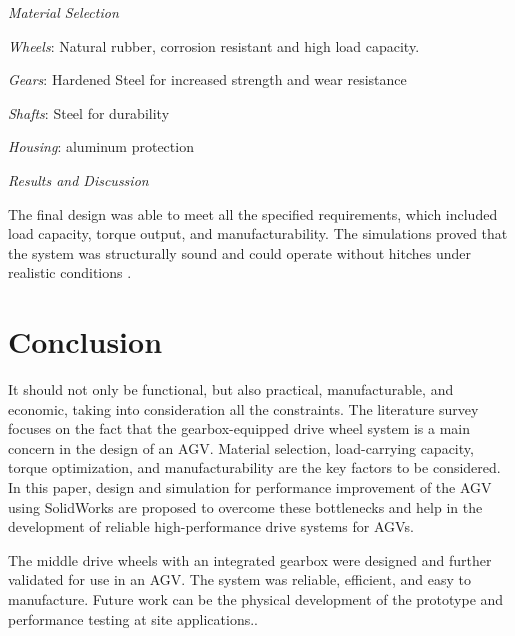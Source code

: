 \documentclass[../../main]{subfiles}
\begin{document}
\emph{Material Selection}

\emph{Wheels}: Natural rubber, corrosion resistant and high load capacity.

\emph{Gears}: Hardened Steel for increased strength and wear resistance

\emph{Shafts}: Steel for durability

\emph{Housing}: aluminum protection

\emph{Results and Discussion}

The final design was able to meet all the specified requirements, which
included load capacity, torque output, and manufacturability. The
simulations proved that the system was structurally sound and could
operate without hitches under realistic conditions .
\newpage
\section{Conclusion}

It should not only be functional, but also practical, manufacturable,
and economic, taking into consideration all the constraints. The
literature survey focuses on the fact that the gearbox-equipped drive
wheel system is a main concern in the design of an AGV. Material
selection, load-carrying capacity, torque optimization, and
manufacturability are the key factors to be considered. In this paper,
design and simulation for performance improvement of the AGV using
SolidWorks are proposed to overcome these bottlenecks and help in the
development of reliable high-performance drive systems for AGVs.

The middle drive wheels with an integrated gearbox were designed and
further validated for use in an AGV. The system was reliable, efficient,
and easy to manufacture. Future work can be the physical development of
the prototype and performance testing at site applications..
\end{document}
